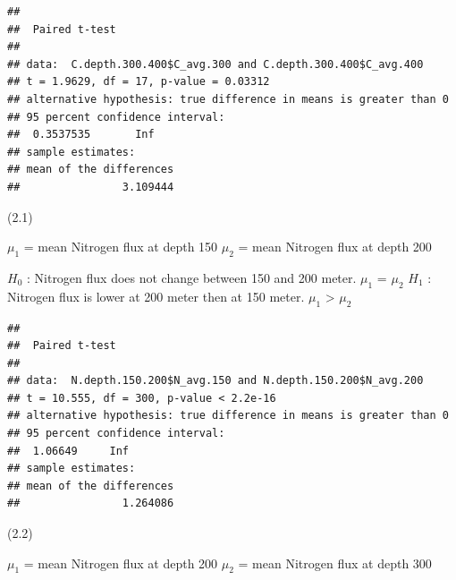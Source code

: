 \documentclass[]{article}
\newenvironment{Shaded}{\begin{snugshade}}{\end{snugshade}}
\newcommand{\DataTypeTok}[1]{\textcolor[rgb]{0.13,0.29,0.53}{#1}}
\newcommand{\FloatTok}[1]{\textcolor[rgb]{0.00,0.00,0.81}{#1}}
\newcommand{\KeywordTok}[1]{\textcolor[rgb]{0.13,0.29,0.53}{\textbf{#1}}}
\newcommand{\NormalTok}[1]{#1}
\newcommand{\OperatorTok}[1]{\textcolor[rgb]{0.81,0.36,0.00}{\textbf{#1}}}
\newcommand{\OtherTok}[1]{\textcolor[rgb]{0.56,0.35,0.01}{#1}}
\newcommand{\StringTok}[1]{\textcolor[rgb]{0.31,0.60,0.02}{#1}}
\begin{document}
\begin{verbatim}
## 
##  Paired t-test
## 
## data:  C.depth.300.400$C_avg.300 and C.depth.300.400$C_avg.400
## t = 1.9629, df = 17, p-value = 0.03312
## alternative hypothesis: true difference in means is greater than 0
## 95 percent confidence interval:
##  0.3537535       Inf
## sample estimates:
## mean of the differences 
##                3.109444
\end{verbatim}

(2.1)

\(\mu_1\) = mean Nitrogen flux at depth 150 \(\mu_2\) = mean Nitrogen
flux at depth 200

\(H_0\) : Nitrogen flux does not change between 150 and 200 meter.
\(\mu_1\) = \(\mu_2\) \(H_1\) : Nitrogen flux is lower at 200 meter then
at 150 meter. \(\mu_1\) \textgreater{} \(\mu_2\)

\begin{Shaded}
\end{Shaded}

\begin{verbatim}
## 
##  Paired t-test
## 
## data:  N.depth.150.200$N_avg.150 and N.depth.150.200$N_avg.200
## t = 10.555, df = 300, p-value < 2.2e-16
## alternative hypothesis: true difference in means is greater than 0
## 95 percent confidence interval:
##  1.06649     Inf
## sample estimates:
## mean of the differences 
##                1.264086
\end{verbatim}

(2.2)

\(\mu_1\) = mean Nitrogen flux at depth 200 \(\mu_2\) = mean Nitrogen
flux at depth 300
\end{document}
